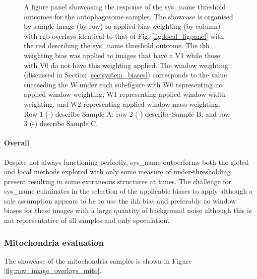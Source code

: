 \begin{figure}[h!]
    \caption[Figure panel showcasing the response of the different weighting biases on the system threshold outcomes for autophagosome samples]{A figure panel showcasing the response of the \gls{sys_name} threshold outcomes for the autophagosome samples. The showcase is organised by sample image (by row) to applied bias weighting (by column) with \gls{rgb} overlays identical to that of Fig. \ref{fig:local_figpanel} with the red describing the \gls{sys_name} threshold outcome. The \gls{ihh} weighting bias was applied to images that have a V1 while those with V0 do not have this weighting applied. The window weighting (discussed in Section \ref{sec:system_biases}) corresponds to the value succeeding the W under each sub-figure with W0 representing no applied window weighting, W1 representing applied window width weighting, and W2 representing applied window mass weighting. Row 1 (-) describe Sample A; row 2 (-) describe Sample B; and row 3 (-) describe Sample C.} 
    \label{fig:local_ihh_figpanel2}
\end{figure}

\paragraph{Overall}
Despite not always functioning perfectly, \gls{sys_name} outperforms both the global and local methods explored with only some measure of under-thresholding present resulting in some extraneous structures at times. The challenge for \gls{sys_name} culminates in the selection of the applicable biases to apply although a safe assumption appears to be to use the \gls{ihh} bias and preferably no window biases for these images with a large quantity of background noise although this is not representative of all samples and only speculation. 
\clearpage
\subsubsection{Mitochondria evaluation}
The showcase of the mitochondria samples is shown in Figure \ref{fig:raw_image_overlays_mito}.

